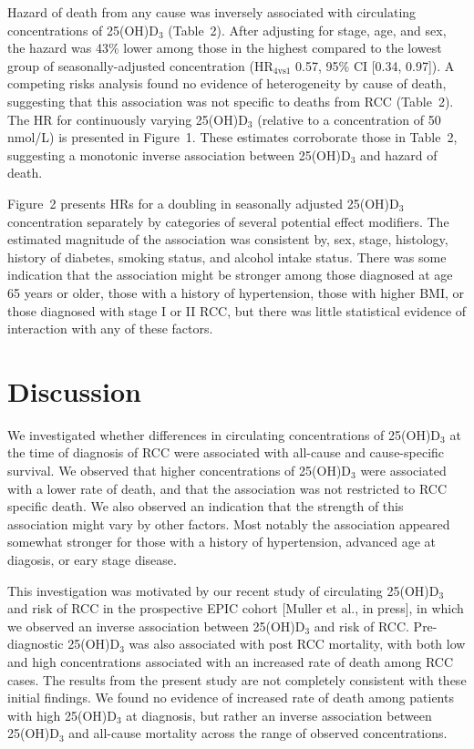 \documentclass[a4paper,11pt]{article}
\begin{document}
Hazard of death from any cause was inversely associated with 
circulating concentrations of 25(OH)D$_3$ (Table~2). After adjusting for 
stage, age, and sex, the hazard was 43\% lower among those in the highest 
compared to the lowest group of seasonally-adjusted concentration 
(HR$_{4\text{vs}1}$ 0.57, 95\% CI [0.34, 0.97]). A competing risks analysis 
found no evidence of heterogeneity by cause of death, suggesting that this 
association was not specific to deaths from RCC (Table~2). The HR for 
continuously varying 25(OH)D$_3$ (relative to a concentration of 50 nmol/L) is 
presented in Figure~1. These estimates corroborate those in Table~2, suggesting 
a monotonic inverse association between 25(OH)D$_3$ and hazard of death.

Figure~2 presents HRs for a doubling in seasonally adjusted 25(OH)D$_3$ 
concentration separately by categories of several potential effect modifiers. 
The estimated magnitude of the association was consistent by, sex, stage, 
histology, history of diabetes, smoking status, and alcohol intake status. 
There was some indication that the association might be stronger among those 
diagnosed at age 65 years or older, those with a history of hypertension, those 
with higher BMI, or those diagnosed with stage I or II RCC, but there was 
little statistical evidence of interaction with any of these factors. 

\section*{Discussion}
We investigated whether differences in circulating concentrations of 
25(OH)D$_3$ at the time of diagnosis of RCC were associated with all-cause and 
cause-specific survival. We observed that higher concentrations of 25(OH)D$_3$ 
were associated with a lower rate of death, and that the 
association was not restricted to RCC specific death. We also observed an 
indication that the strength of this association might vary by other factors.
Most notably the association appeared somewhat stronger for those with a 
history of hypertension, advanced age at diagosis, or eary stage disease.

This investigation was motivated by our recent study of circulating 25(OH)D$_3$ 
and risk of RCC in the prospective EPIC cohort [Muller et al., in press], in 
which we observed an inverse association between 25(OH)D$_3$ and risk of RCC. 
Pre-diagnostic 25(OH)D$_3$ was also associated with post RCC mortality, with 
both low and high concentrations associated with an increased rate of death 
among RCC cases. The results from the present study are not completely 
consistent with these initial findings. We found no evidence of increased rate 
of death among patients with high 25(OH)D$_3$ at diagnosis, but rather an 
inverse association between 25(OH)D$_3$ and all-cause mortality across the 
range of observed concentrations.
\end{document}
